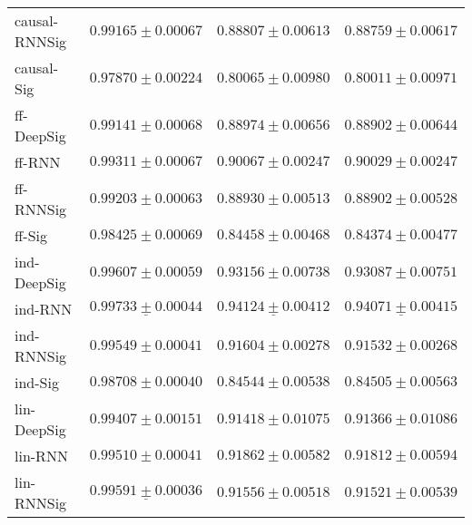 \begin{tabular}{llll}
causal-RNNSig  &                           $ 0.99165 \pm 0.00067 $ &                           $ 0.88807 \pm 0.00613 $ &                           $ 0.88759 \pm 0.00617 $ \\
causal-Sig     &                           $ 0.97870 \pm 0.00224 $ &                           $ 0.80065 \pm 0.00980 $ &                           $ 0.80011 \pm 0.00971 $ \\
ff-DeepSig     &                           $ 0.99141 \pm 0.00068 $ &                           $ 0.88974 \pm 0.00656 $ &                           $ 0.88902 \pm 0.00644 $ \\
ff-RNN         &                           $ 0.99311 \pm 0.00067 $ &                           $ 0.90067 \pm 0.00247 $ &                           $ 0.90029 \pm 0.00247 $ \\
ff-RNNSig      &                           $ 0.99203 \pm 0.00063 $ &                           $ 0.88930 \pm 0.00513 $ &                           $ 0.88902 \pm 0.00528 $ \\
ff-Sig         &                           $ 0.98425 \pm 0.00069 $ &                           $ 0.84458 \pm 0.00468 $ &                           $ 0.84374 \pm 0.00477 $ \\
ind-DeepSig    &               $  \mathbf{ 0.99607 \pm 0.00059 } $ &               $  \mathbf{ 0.93156 \pm 0.00738 } $ &               $  \mathbf{ 0.93087 \pm 0.00751 } $ \\
ind-RNN        &  $  \mathbf{ \underline{ 0.99733 \pm 0.00044 }} $ &  $  \mathbf{ \underline{ 0.94124 \pm 0.00412 }} $ &  $  \mathbf{ \underline{ 0.94071 \pm 0.00415 }} $ \\
ind-RNNSig     &                           $ 0.99549 \pm 0.00041 $ &                           $ 0.91604 \pm 0.00278 $ &                           $ 0.91532 \pm 0.00268 $ \\
ind-Sig        &                           $ 0.98708 \pm 0.00040 $ &                           $ 0.84544 \pm 0.00538 $ &                           $ 0.84505 \pm 0.00563 $ \\
lin-DeepSig    &                           $ 0.99407 \pm 0.00151 $ &                           $ 0.91418 \pm 0.01075 $ &                           $ 0.91366 \pm 0.01086 $ \\
lin-RNN        &                           $ 0.99510 \pm 0.00041 $ &                           $ 0.91862 \pm 0.00582 $ &                           $ 0.91812 \pm 0.00594 $ \\
lin-RNNSig     &            $  \underline{ 0.99591 \pm 0.00036 } $ &                           $ 0.91556 \pm 0.00518 $ &                           $ 0.91521 \pm 0.00539 $ \\

\end{tabular}
